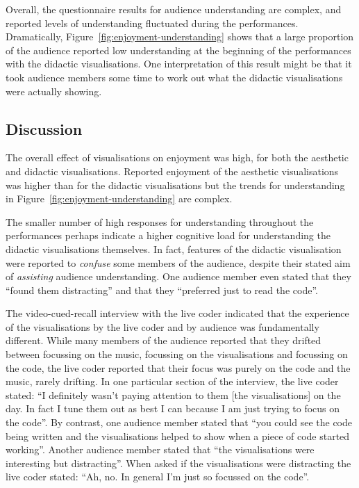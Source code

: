 \documentclass{sig-alternate}
\begin{document}
Overall, the questionnaire results for audience understanding are
complex, and reported levels of understanding fluctuated during the
performances. Dramatically, Figure~\ref{fig:enjoyment-understanding}
shows that a large proportion of the audience reported low
understanding at the beginning of the performances with the didactic
visualisations. One interpretation of this result might be that it
took audience members some time to work out what the didactic
visualisations were actually showing.

\subsection{Discussion}

The overall effect of visualisations on enjoyment was high, for both
the aesthetic and didactic visualisations. Reported enjoyment of the
aesthetic visualisations was higher than for the didactic
visualisations but the trends for understanding in
Figure~\ref{fig:enjoyment-understanding} are complex.

The smaller number of high responses for understanding throughout the
performances perhaps indicate a higher cognitive load for
understanding the didactic visualisations themselves. In fact,
features of the didactic visualisation were reported to \emph{confuse}
some members of the audience, despite their stated aim of
\emph{assisting} audience understanding. One audience member even
stated that they ``found them distracting'' and that they ``preferred
just to read the code''.

The video-cued-recall interview with the live coder indicated that the
experience of the visualisations by the live coder and by audience was
fundamentally different. While many members of the audience reported
that they drifted between focussing on the music, focussing on the
visualisations and focussing on the code, the live coder reported that
their focus was purely on the code and the music, rarely drifting. In
one particular section of the interview, the live coder stated: ``I
definitely wasn't paying attention to them [the visualisations] on the
day. In fact I tune them out as best I can because I am just trying to
focus on the code''. By contrast, one audience member stated that
``you could see the code being written and the visualisations helped
to show when a piece of code started working''. Another audience
member stated that ``the visualisations were interesting but
distracting''. When asked if the visualisations were distracting the
live coder stated: ``Ah, no. In general I'm just so focussed on the
code''.
\end{document}
